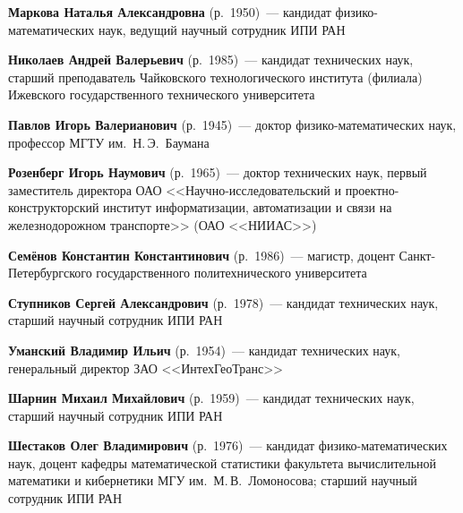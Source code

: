 \begin{multicols}{2}
\vspace*{5pt}

\noindent
\textbf{Маркова Наталья Александровна} (р.\ 1950)~--- кандидат
фи\-зи\-ко-ма\-те\-ма\-ти\-че\-ских наук,  ведущий научный сотрудник ИПИ РАН

\columnbreak


\noindent
\textbf{Николаев Андрей Валерьевич} (р.\ 1985)~--- кандидат технических наук, 
старший преподаватель Чайковского технологического института (филиала) Ижевского 
государственного технического университета

\vspace*{6pt}

\noindent
\textbf{Павлов Игорь Валерианович} (р.\ 1945)~---  доктор фи\-зи\-ко-ма\-те\-ма\-ти\-че\-ских 
наук, профессор МГТУ им.\ Н.\,Э.~Баумана

\vspace*{6pt}

\noindent
\textbf{Розенберг Игорь Наумович} (р.\ 1965)~--- доктор технических наук, 
первый заместитель директора ОАО <<На\-уч\-но-ис\-сле\-до\-ва\-тель\-ский и 
проект\-но-кон\-ст\-рук\-тор\-ский институт информатизации, автоматизации и 
связи на железнодорожном транспорте>> (ОАО <<НИИАС>>) 

\vspace*{6pt}

\noindent
\textbf{Семёнов Константин Константинович} 
(р.\ 1986)~--- магистр, доцент Санкт-Пе\-тер\-бург\-ско\-го государственного политехнического  университета

\vspace*{6pt}

\noindent
\textbf{Ступников  Сергей Александрович}  (р.\ 1978)~--- 
кандидат технических  наук, старший научный сотрудник ИПИ РАН

\vspace*{6pt}

\noindent
\textbf{Уманский Владимир Ильич} (р.\ 1954)~--- кандидат технических наук, 
генеральный директор ЗАО <<ИнтехГеоТранс>>

\vspace*{6pt}

\noindent
\textbf{Шарнин Михаил Михайлович} (р.\ 1959)~--- кандидат технических наук, 
старший научный сотрудник ИПИ РАН

\vspace*{6pt}

\noindent
\textbf{Шестаков Олег Владимирович} (р.\ 1976)~--- кандидат фи\-зи\-ко-математических наук,
доцент ка\-фед\-ры математической статистики факультета вычислительной математики и кибернетики
МГУ им.~М.\,В.~Ломоносова; старший научный сотрудник ИПИ РАН


\def\leftfootline{\small{\textbf{\thepage}
\hfill ИНФОРМАТИКА И ЕЁ ПРИМЕНЕНИЯ\ \ \ том~6\ \ \ выпуск~2\ \ \ 2012}
}%
 \def\rightfootline{\small{ИНФОРМАТИКА И ЕЁ ПРИМЕНЕНИЯ\ \ \ том~6\ \ \ выпуск~2\ \ \ 2012
\hfill \textbf{\thepage}}}


\end{multicols}

\newpage
